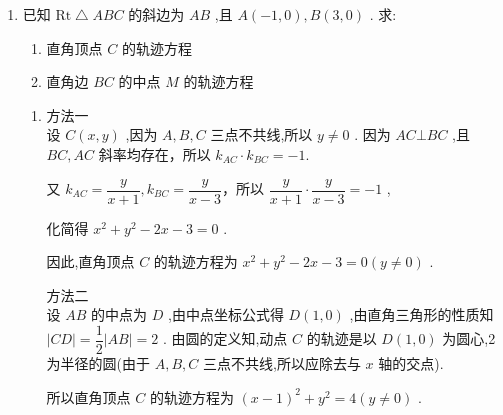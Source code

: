 \begin{enumerate}
\begin{enumerate}
\begin{jieda}
            又点 $Q\left( {{x}_{0},{y}_{0}}\right)$ 在圆 $C : {\left( x + 3\right) }^{2} + {\left( y + 2\right) }^{2} = {25}$ 上运动,所以 ${\left( {x}_{0} + 3\right) }^{2} + {\left( {y}_{0} + 2\right) }^{2} = {25}$ ,
            
            即 ${\left( 2x - 5 + 3\right) }^{2} + {\left( 2y + 2\right) }^{2} = {25}$ .
            
            整理得 ${\left( x - 1\right) }^{2} + {\left( y + 1\right) }^{2} = \dfrac{25}{4}$ .
            
            即所求线段 ${PQ}$ 的中点 $M$ 的轨迹方程为 ${\left( x - 1\right) }^{2} + {\left( y + 1\right) }^{2} = \dfrac{25}{4}$ .
        \end{jieda}
        \item 已知 $\mathrm{{Rt}}\bigtriangleup {ABC}$ 的斜边为 ${AB}$ ,且 $A\left( {-1,0}\right) ,B\left( {3,0}\right)$ . 求:
        \begin{enumerate}
            \item 直角顶点 $C$ 的轨迹方程
            \item 直角边 ${BC}$ 的中点 $M$ 的轨迹方程
        \end{enumerate}
        \begin{jieda}
            \begin{enumerate}
                \item 方法一 \\
                设 $C\left( {x,y}\right)$ ,因为 $A,B,C$ 三点不共线,所以 $y \neq  0$ . 因为 ${AC}\bot {BC}$ ,且 ${BC},{AC}$ 斜率均存在，所以 ${k}_{AC} \cdot  {k}_{BC} =  - 1$.
                
                又 ${k}_{AC} = \dfrac{y}{x + 1},{k}_{BC} = \dfrac{y}{x - 3}$，所以 $\dfrac{y}{x + 1} \cdot  \dfrac{y}{x - 3} =  - 1$ ,
                
                化简得 ${x}^{2} + {y}^{2} - {2x} - 3 = 0$ .
                
                因此,直角顶点 $C$ 的轨迹方程为 ${x}^{2} + {y}^{2} - {2x} - 3 = 0\left( {y \neq  0}\right)$ .

                方法二 \\
                设 ${AB}$ 的中点为 $D$ ,由中点坐标公式得 $D\left( {1,0}\right)$ ,由直角三角形的性质知 $\left| {CD}\right|  = \dfrac{1}{2}\left| {AB}\right|  = 2$ . 由圆的定义知,动点 $C$ 的轨迹是以 $D\left( {1,0}\right)$ 为圆心,2 为半径的圆(由于 $A,B,C$ 三点不共线,所以应除去与 $x$ 轴的交点).
                
                所以直角顶点 $C$ 的轨迹方程为 ${\left( x - 1\right) }^{2} + {y}^{2} = 4\left( {y \neq  0}\right)$ .


\end{enumerate}
\end{jieda}
\end{enumerate}
\end{enumerate}
